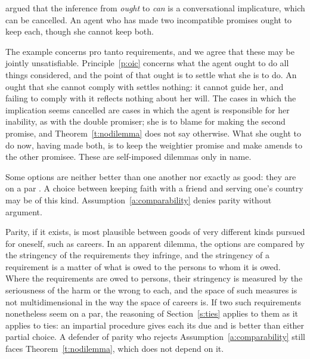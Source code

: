 \documentclass{situationist-preprint}
\begin{document}
\begin{objection}
\citet{SinnottArmstrong1984} argued that the inference from \emph{ought} to \emph{can} is a conversational implicature, which can be cancelled. An agent who has made two incompatible promises ought to keep each, though she cannot keep both.
\end{objection}

\begin{reply}
The example concerns pro tanto requirements, and we agree that these may be jointly unsatisfiable. Principle~\ref{p:oic} concerns what the agent ought to do all things considered, and the point of that ought is to settle what she is to do. An ought that she cannot comply with settles nothing: it cannot guide her, and failing to comply with it reflects nothing about her will. The cases in which the implication seems cancelled are cases in which the agent is responsible for her inability, as with the double promiser; she is to blame for making the second promise, and Theorem~\ref{t:nodilemma} does not say otherwise. What she ought to do now, having made both, is to keep the weightier promise and make amends to the other promisee. These are self-imposed dilemmas only in name.
\end{reply}

\begin{objection}[Parity]
Some options are neither better than one another nor exactly as good: they are on a par \citep{Chang2002}. A choice between keeping faith with a friend and serving one's country may be of this kind. Assumption~\ref{a:comparability} denies parity without argument.
\end{objection}

\begin{reply}
Parity, if it exists, is most plausible between goods of very different kinds pursued for oneself, such as careers. In an apparent dilemma, the options are compared by the stringency of the requirements they infringe, and the stringency of a requirement is a matter of what is owed to the persons to whom it is owed. Where the requirements are owed to persons, their stringency is measured by the seriousness of the harm or the wrong to each, and the space of such measures is not multidimensional in the way the space of careers is. If two such requirements nonetheless seem on a par, the reasoning of Section~\ref{s:ties} applies to them as it applies to ties: an impartial procedure gives each its due and is better than either partial choice. A defender of parity who rejects Assumption~\ref{a:comparability} still faces Theorem~\ref{t:nodilemma}, which does not depend on it.
\end{reply}
\end{document}

